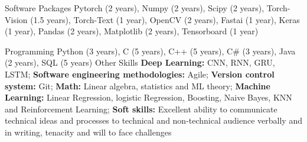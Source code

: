 \vspace*{0.08in}
\begin{cvskills}
\vspace*{0.06in}
  \cvskill
    {Software Packages} %
    {Pytorch (2 years), Numpy (2 years), Scipy (2 years), Torch-Vision (1.5 years), Torch-Text (1 year), OpenCV (2 years), Fastai (1 year), Keras (1 year), Pandas (2 years), Matplotlib (2 years), Tensorboard (1 year) } %

%
\vspace*{0.06in}
  \cvskill
    {Programming} %
    {Python (3 years), C (5 years), C++ (5 years), C\# (3 years), Java (2 years), SQL (5 years)} %
\vspace*{0.06in}
  \cvskill
    {Other Skills} %
    {\textbf{Deep Learning:} CNN, RNN, GRU, LSTM;   \textbf{Software engineering methodologies:} Agile;  \textbf{Version control system:} Git; \textbf{Math:} Linear algebra, statistics and ML theory; \textbf{Machine Learning:} Linear Regression, logistic Regression, Boosting, Naive Bayes, KNN and  Reinforcement Learning;  \textbf{Soft skills:} Excellent ability to communicate technical ideas and processes to technical and non-technical audience verbally and in writing, tenacity and will to face challenges} %
\end{cvskills}
